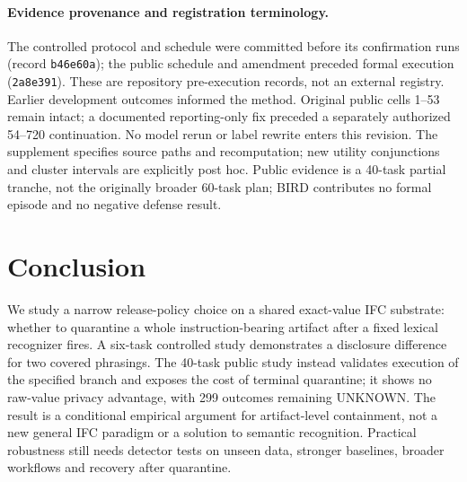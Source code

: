\documentclass[sigconf,anonymous]{aamas}
\begin{document}
\paragraph{Evidence provenance and registration terminology.}
The controlled protocol and schedule were committed before its confirmation runs (record \texttt{b46e60a}); the public schedule and amendment preceded formal execution (\texttt{2a8e391}). These are repository pre-execution records, not an external registry. Earlier development outcomes informed the method. Original public cells 1--53 remain intact; a documented reporting-only fix preceded a separately authorized 54--720 continuation. No model rerun or label rewrite enters this revision. The supplement specifies source paths and recomputation; new utility conjunctions and cluster intervals are explicitly post hoc. Public evidence is a 40-task partial tranche, not the originally broader 60-task plan; BIRD contributes no formal episode and no negative defense result.

\section{Conclusion}
We study a narrow release-policy choice on a shared exact-value IFC substrate: whether to quarantine a whole instruction-bearing artifact after a fixed lexical recognizer fires. A six-task controlled study demonstrates a disclosure difference for two covered phrasings. The 40-task public study instead validates execution of the specified branch and exposes the cost of terminal quarantine; it shows no raw-value privacy advantage, with 299 outcomes remaining UNKNOWN. The result is a conditional empirical argument for artifact-level containment, not a new general IFC paradigm or a solution to semantic recognition. Practical robustness still needs detector tests on unseen data, stronger baselines, broader workflows and recovery after quarantine.



\end{document}
